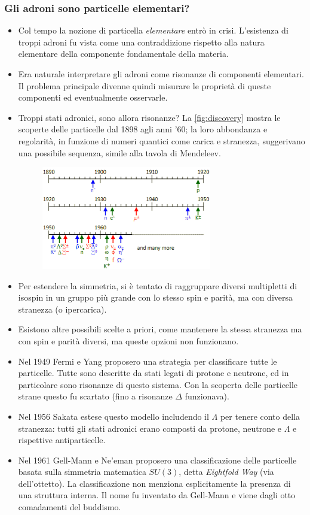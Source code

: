 \subsubsection{Gli adroni sono particelle elementari?}
\begin{itemize}
    \item Col tempo la nozione di particella \textit{elementare} entrò in crisi. L'esistenza di troppi adroni fu vista come una contraddizione rispetto alla natura elementare della componente fondamentale della materia.
    \item Era naturale interpretare gli adroni come risonanze di componenti elementari. Il problema principale divenne quindi misurare le proprietà di queste componenti ed eventualmente osservarle.
    \item Troppi stati adronici, sono allora risonanze? La \autoref{fig:discovery} mostra le scoperte delle particelle dal 1898 agli anni '60; la loro abbondanza e regolarità, in funzione di numeri quantici come carica e stranezza, suggerivano una possibile sequenza, simile alla tavola di Mendeleev.
    \begin{figure}[H]
        \centering
        \includegraphics[width=0.7\textwidth]{immagini/fig_discovery.png}
        \label{fig:discovery}
    \end{figure}
    \item Per estendere la simmetria, si è tentato di raggruppare diversi multipletti di isospin in un gruppo più grande con lo stesso spin e parità, ma con diversa stranezza (o ipercarica).
    \item Esistono altre possibili scelte a priori, come mantenere la stessa stranezza ma con spin e parità diversi, ma queste opzioni non funzionano.
    \item Nel 1949 Fermi e Yang proposero una strategia per classificare tutte le particelle. Tutte sono descritte da stati legati di protone e neutrone, ed in particolare sono risonanze di questo sistema. Con la scoperta delle particelle strane questo fu scartato (fino a risonanze $\Delta$ funzionava).
    \item Nel 1956 Sakata estese questo modello includendo il $\Lambda$ per tenere conto della stranezza: tutti gli stati adronici erano composti da protone, neutrone e $\Lambda$ e rispettive antiparticelle.
    \item Nel 1961 Gell-Mann e Ne'eman proposero una classificazione delle particelle basata sulla simmetria matematica $SU(3)$, detta \textit{Eightfold Way} (via dell'ottetto). La classificazione non menziona esplicitamente la presenza di una struttura interna. Il nome fu inventato da Gell-Mann e viene dagli otto comadamenti del buddismo.
\end{itemize}

